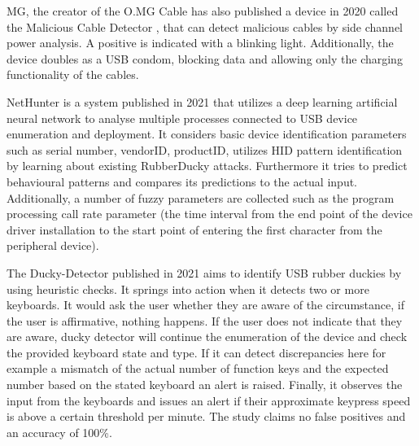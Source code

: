 MG, the creator of the O.MG Cable has also published a device in 2020 called the Malicious Cable Detector \cite{hak5MaliciousCableDetector}, that can detect malicious cables by side channel power analysis. A positive is indicated with a blinking light. Additionally, the device doubles as a USB condom, blocking data and allowing only the charging functionality of the cables. 

NetHunter \cite{IntelligentSystemPreventing} is a system published in 2021 that utilizes a deep learning artificial neural network to analyse multiple processes connected to USB device enumeration and deployment. It considers basic device identification parameters such as serial number, vendorID, productID, utilizes HID pattern identification by learning about existing RubberDucky attacks. Furthermore it tries to predict behavioural patterns and compares its predictions to the actual input. Additionally, a number of fuzzy parameters are collected such as the program processing call rate parameter (the time interval from the end point of the device driver installation to the start point of entering the first character from the peripheral device). 


The Ducky-Detector \cite{USBRubberDucky2021} published in 2021 aims to identify USB rubber duckies by using heuristic checks. It springs into action when it detects two or more keyboards. It would ask the user whether they are aware of the circumstance, if the user is affirmative, nothing happens. If the user does not indicate that they are aware, ducky detector will continue the enumeration of the device and check the provided keyboard state and type. If it can detect discrepancies here for example a mismatch of the actual number of function keys and the expected number based on the stated keyboard an alert is raised. Finally, it observes the input from the keyboards and issues an alert if their approximate keypress speed is above a certain threshold per minute. The study claims no false positives and an accuracy of 100\%. 



